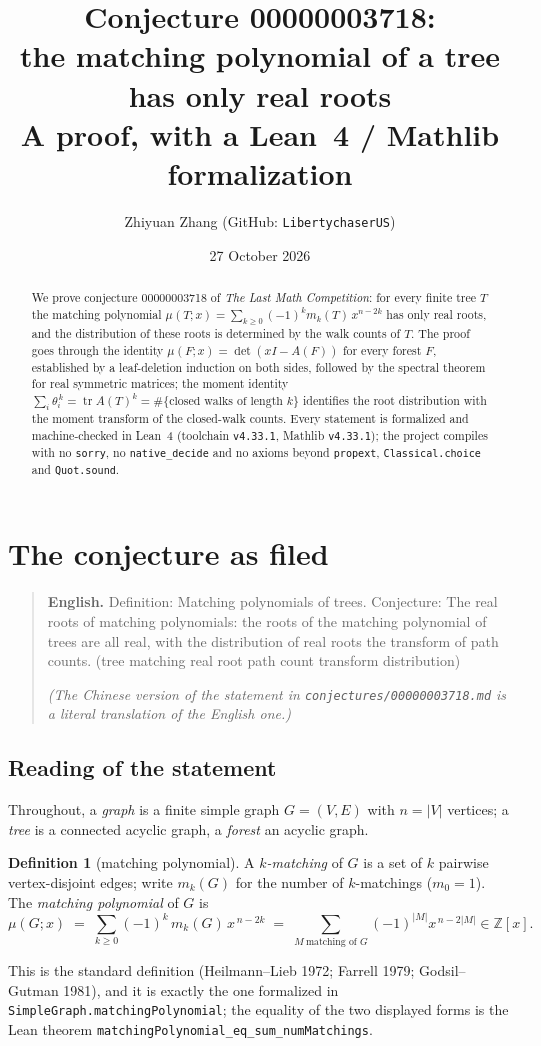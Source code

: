 \documentclass[11pt,a4paper]{article}
\title{Conjecture 00000003718:\\ the matching polynomial of a tree has only real roots\\
\large A proof, with a Lean~4 / Mathlib formalization}
\author{Zhiyuan Zhang (GitHub: \texttt{LibertychaserUS})}
\date{27 October 2026}
\theoremstyle{definition}
\newtheorem{definition}[theorem]{Definition}
\theoremstyle{remark}
\newcommand{\Z}{\mathbb{Z}}
\DeclareMathOperator{\tr}{tr}
\begin{document}
\maketitle

\begin{abstract}
We prove conjecture 00000003718 of \emph{The Last Math Competition}: for every finite tree $T$
the matching polynomial $\mu(T;x)=\sum_{k\ge 0}(-1)^k m_k(T)\,x^{n-2k}$ has only real roots, and
the distribution of these roots is determined by the walk counts of $T$. The proof goes through
the identity $\mu(F;x)=\det(xI-A(F))$ for every forest $F$, established by a leaf-deletion
induction on both sides, followed by the spectral theorem for real symmetric matrices; the moment
identity $\sum_i\theta_i^{\,k}=\tr A(T)^k=\#\{\text{closed walks of length }k\}$ identifies the
root distribution with the moment transform of the closed-walk counts. Every statement is
formalized and machine-checked in Lean~4 (toolchain \texttt{v4.33.1}, Mathlib \texttt{v4.33.1});
the project compiles with no \texttt{sorry}, no \texttt{native\_decide} and no axioms beyond
\texttt{propext}, \texttt{Classical.choice} and \texttt{Quot.sound}.
\end{abstract}

\section{The conjecture as filed}

\begin{quote}\small
\textbf{English.} Definition: Matching polynomials of trees. Conjecture: The real roots of
matching polynomials: the roots of the matching polynomial of trees are all real, with the
distribution of real roots the transform of path counts. (tree matching real root path count
transform distribution)

\emph{(The Chinese version of the statement in \texttt{conjectures/00000003718.md} is a literal
translation of the English one.)}
\end{quote}

\subsection{Reading of the statement}

Throughout, a \emph{graph} is a finite simple graph $G=(V,E)$ with $n=|V|$ vertices; a
\emph{tree} is a connected acyclic graph, a \emph{forest} an acyclic graph.

\begin{definition}[matching polynomial]
A \emph{$k$-matching} of $G$ is a set of $k$ pairwise vertex-disjoint edges; write $m_k(G)$ for
the number of $k$-matchings ($m_0=1$). The \emph{matching polynomial} of $G$ is
\[
  \mu(G;x) \;=\; \sum_{k\ge 0} (-1)^k\, m_k(G)\, x^{\,n-2k}
  \;=\; \sum_{M\ \text{matching of }G} (-1)^{|M|} x^{\,n-2|M|}\in\Z[x].
\]
\end{definition}
This is the standard definition (Heilmann--Lieb 1972; Farrell 1979; Godsil--Gutman 1981), and it is
exactly the one formalized in \texttt{SimpleGraph.matchingPolynomial}; the equality of the two
displayed forms is the Lean theorem \texttt{matchingPolynomial\_eq\_sum\_numMatchings}.
\end{document}
